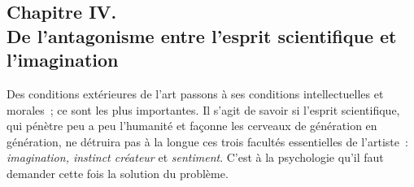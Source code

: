 \documentclass[french,twoside]{book} %
\begin{document}
\subsection[{Chapitre IV. De l’antagonisme entre l’esprit scientifique et l’imagination}]{Chapitre IV. \\
De l’antagonisme entre l’esprit scientifique et l’imagination}
\noindent  Des conditions extérieures de l’art passons à ses conditions intellectuelles et morales ; ce sont les plus importantes. Il s’agit de savoir si l’esprit scientifique, qui pénètre peu a peu l’humanité et façonne les cerveaux de génération en génération, ne détruira pas à la longue ces trois facultés essentielles de l’artiste : \emph{imagination, instinct créateur} et \emph{sentiment}. C’est à la psychologie qu’il faut demander cette fois la solution du problème.\par
\end{document}
